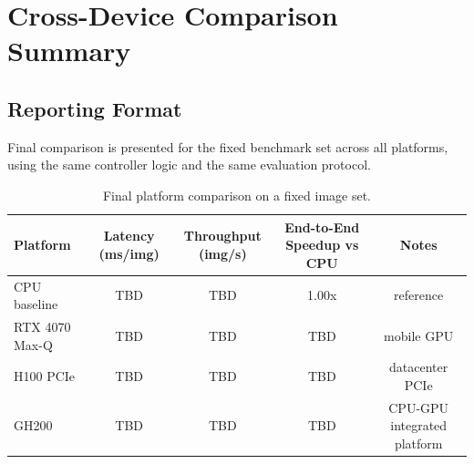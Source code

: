 



\section{Cross-Device Comparison Summary}

\subsection{Reporting Format}
Final comparison is presented for the fixed benchmark set across all platforms, using the same controller logic and the same evaluation protocol.

\begin{table}[H]
\centering
\begin{tabular}{lcccc}	
\toprule
Platform & Latency (ms/img) & Throughput (img/s) & End-to-End Speedup vs CPU & Notes \\
\midrule
CPU baseline & TBD & TBD & 1.00x & reference \\
RTX 4070 Max-Q & TBD & TBD & TBD & mobile GPU \\
H100 PCIe & TBD & TBD & TBD & datacenter PCIe \\
GH200 & TBD & TBD & TBD & CPU-GPU integrated platform \\
\bottomrule
\end{tabular}
\caption{Final platform comparison on a fixed image set.}
\end{table}

